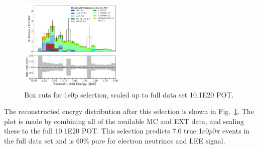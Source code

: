\documentclass[a4paper]{article}
\newcommand{\zpsel}{1$e$0$p$0$\pi$\xspace}
\begin{document}
\begin{figure}[H]
\begin{center}
\includegraphics[width=0.45\textwidth]{1e0p/run123/reco_e_BoxCut_R1R2R3.pdf}
\caption{\label{fig:1e0p:cutbased:RUN3} Box cuts for 1e0p selection, scaled up to full data set 10.1E20 POT.}
\end{center}
\end{figure}

The reconstructed energy distribution after this selection is shown in Fig.~\ref{fig:1e0p:cutbased:RUN3}.  The plot is made by combining all of the available MC and EXT data, and scaling these to the full 10.1E20 POT.  This selection predicts 7.0 true \zpsel events in the full data set and is 60\% pure for electron neutrinos and LEE signal.

\end{document}
